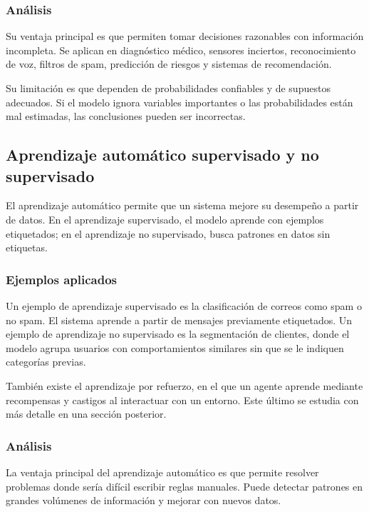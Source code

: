 \subsubsection{Análisis}

Su ventaja principal es que permiten tomar decisiones razonables con información incompleta. Se aplican en diagnóstico médico, sensores inciertos, reconocimiento de voz, filtros de spam, predicción de riesgos y sistemas de recomendación.

Su limitación es que dependen de probabilidades confiables y de supuestos adecuados. Si el modelo ignora variables importantes o las probabilidades están mal estimadas, las conclusiones pueden ser incorrectas.

\subsection{Aprendizaje automático supervisado y no supervisado}

El aprendizaje automático permite que un sistema mejore su desempeño a partir de datos. En el aprendizaje supervisado, el modelo aprende con ejemplos etiquetados; en el aprendizaje no supervisado, busca patrones en datos sin etiquetas.

\subsubsection{Ejemplos aplicados}

Un ejemplo de aprendizaje supervisado es la clasificación de correos como spam o no spam. El sistema aprende a partir de mensajes previamente etiquetados. Un ejemplo de aprendizaje no supervisado es la segmentación de clientes, donde el modelo agrupa usuarios con comportamientos similares sin que se le indiquen categorías previas.

También existe el aprendizaje por refuerzo, en el que un agente aprende mediante recompensas y castigos al interactuar con un entorno. Este último se estudia con más detalle en una sección posterior.

\subsubsection{Análisis}

La ventaja principal del aprendizaje automático es que permite resolver problemas donde sería difícil escribir reglas manuales. Puede detectar patrones en grandes volúmenes de información y mejorar con nuevos datos.

